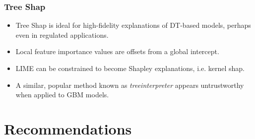 \documentclass[11pt,
               aspectratio=169
               ]{beamer}
\begin{document}
		\begin{frame}
		
			\frametitle{Tree Shap}
			
			\begin{itemize}
				
				\item Tree Shap is ideal for high-fidelity explanations of DT-based models, perhaps even in regulated applications.
				
				\item Local feature importance values are offsets from a global intercept.
				
				\item LIME can be constrained to become Shapley explanations, i.e. kernel shap.
				
				\item A similar, popular method known as \textit{treeinterpreter} appears untrustworthy when applied to GBM models. 
				
			\end{itemize}
			
		\end{frame}


	\section{Recommendations}
\end{document}
